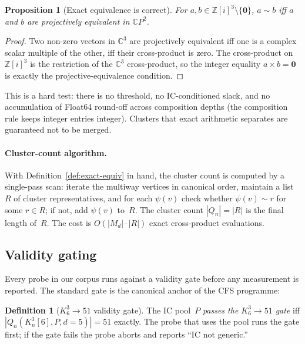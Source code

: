 \documentclass[12pt,a4paper]{article}
\newtheorem{proposition}[theorem]{Proposition}
\theoremstyle{definition}
\newtheorem{definition}[theorem]{Definition}
\theoremstyle{remark}
\newcommand{\bZi}{\mathbb{Z}[i]}            %
\newcommand{\bC}{\mathbb{C}}
\newcommand{\Kn}{K_n^3}
\newcommand{\Qn}{Q_n}
\newcommand{\proj}{\mathrel{\sim}}          %
\begin{document}
\begin{proposition}[Exact equivalence is correct]\label{prop:exact-correct}
For $a, b \in \bZi^3 \setminus \{\mathbf{0}\}$,
$a \proj b$ iff $a$ and $b$ are projectively equivalent in $\bC P^2$.
\end{proposition}

\begin{proof}
Two non-zero vectors in $\bC^3$ are projectively equivalent iff one
is a complex scalar multiple of the other, iff their cross-product is
zero. The cross-product on $\bZi^3$ is the restriction of the $\bC^3$
cross-product, so the integer equality $a \times b = \mathbf{0}$ is
exactly the projective-equivalence condition.
\end{proof}

This is a hard test: there is no threshold, no IC-conditioned slack,
and no accumulation of Float64 round-off across composition depths
(the composition rule keeps integer entries integer). Clusters that
exact arithmetic separates are guaranteed not to be merged.

\paragraph{Cluster-count algorithm.}
With Definition~\ref{def:exact-equiv} in hand, the cluster count is
computed by a single-pass scan: iterate the multiway vertices in
canonical order, maintain a list~$R$ of cluster representatives, and
for each $\psi(v)$ check whether $\psi(v) \proj r$ for some $r \in R$;
if not, add $\psi(v)$ to~$R$. The cluster count $|\Qn| = |R|$ is the
final length of~$R$. The cost is $O(|M_d| \cdot |R|)$ exact
cross-product evaluations.

\subsection{Validity gating}\label{sec:methods-gating}

Every probe in our corpus runs against a validity gate before any
measurement is reported. The standard gate is the canonical anchor
of the CFS programme:

\begin{definition}[$K_6^3 \to 51$ validity gate]\label{def:gate-K6}
The IC pool~$P$ \emph{passes the $K_6^3 \to 51$ gate} iff
$|\Qn(\Kn[6], P, d=5)| = 51$ exactly. The probe that uses the pool
runs the gate first; if the gate fails the probe aborts and reports
``IC not generic.''
\end{definition}
\end{document}
